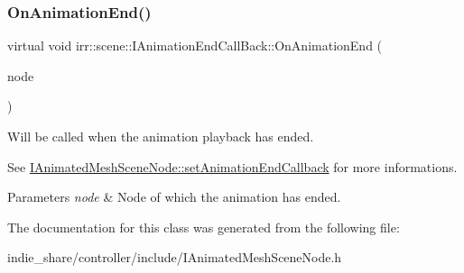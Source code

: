 \subsubsection{\texorpdfstring{On\+Animation\+End()}{OnAnimationEnd()}\hspace{0.1cm}{\footnotesize\ttfamily [2/2]}}
{\footnotesize\ttfamily virtual void irr\+::scene\+::\+I\+Animation\+End\+Call\+Back\+::\+On\+Animation\+End (\begin{DoxyParamCaption}\item[{\hyperlink{classirr_1_1scene_1_1IAnimatedMeshSceneNode}{I\+Animated\+Mesh\+Scene\+Node} $\ast$}]{node }\end{DoxyParamCaption})\hspace{0.3cm}{\ttfamily [pure virtual]}}



Will be called when the animation playback has ended. 

See \hyperlink{classirr_1_1scene_1_1IAnimatedMeshSceneNode_ad688bb5a7654116d1ee823e48393f1bd}{I\+Animated\+Mesh\+Scene\+Node\+::set\+Animation\+End\+Callback} for more informations. 
\begin{DoxyParams}{Parameters}
{\em node} & Node of which the animation has ended. \\
\hline
\end{DoxyParams}


The documentation for this class was generated from the following file\+:\begin{DoxyCompactItemize}
\item 
indie\+\_\+share/controller/include/I\+Animated\+Mesh\+Scene\+Node.\+h\end{DoxyCompactItemize}
